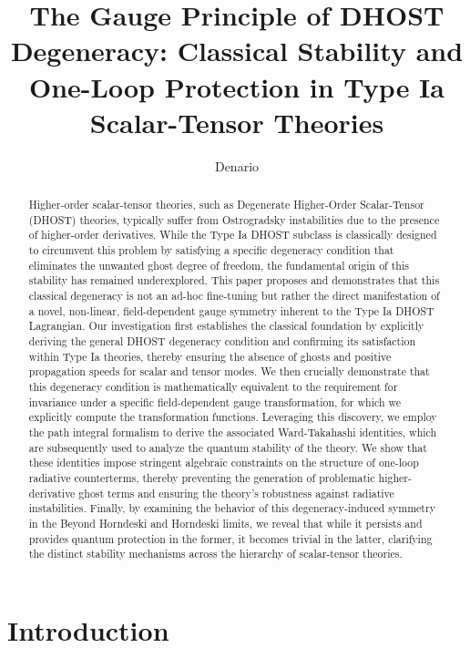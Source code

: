 \documentclass[twocolumn]{aastex631}
\begin{document}
\title{The Gauge Principle of DHOST Degeneracy: Classical Stability and One-Loop Protection in Type Ia Scalar-Tensor Theories}

\author{Denario}

\begin{abstract}
Higher-order scalar-tensor theories, such as Degenerate Higher-Order Scalar-Tensor (DHOST) theories, typically suffer from Ostrogradsky instabilities due to the presence of higher-order derivatives. While the Type Ia DHOST subclass is classically designed to circumvent this problem by satisfying a specific degeneracy condition that eliminates the unwanted ghost degree of freedom, the fundamental origin of this stability has remained underexplored. This paper proposes and demonstrates that this classical degeneracy is not an ad-hoc fine-tuning but rather the direct manifestation of a novel, non-linear, field-dependent gauge symmetry inherent to the Type Ia DHOST Lagrangian. Our investigation first establishes the classical foundation by explicitly deriving the general DHOST degeneracy condition and confirming its satisfaction within Type Ia theories, thereby ensuring the absence of ghosts and positive propagation speeds for scalar and tensor modes. We then crucially demonstrate that this degeneracy condition is mathematically equivalent to the requirement for invariance under a specific field-dependent gauge transformation, for which we explicitly compute the transformation functions. Leveraging this discovery, we employ the path integral formalism to derive the associated Ward-Takahashi identities, which are subsequently used to analyze the quantum stability of the theory. We show that these identities impose stringent algebraic constraints on the structure of one-loop radiative counterterms, thereby preventing the generation of problematic higher-derivative ghost terms and ensuring the theory's robustness against radiative instabilities. Finally, by examining the behavior of this degeneracy-induced symmetry in the Beyond Horndeski and Horndeski limits, we reveal that while it persists and provides quantum protection in the former, it becomes trivial in the latter, clarifying the distinct stability mechanisms across the hierarchy of scalar-tensor theories.
\end{abstract}



\section{Introduction}
\label{sec:intro}
\end{document}
